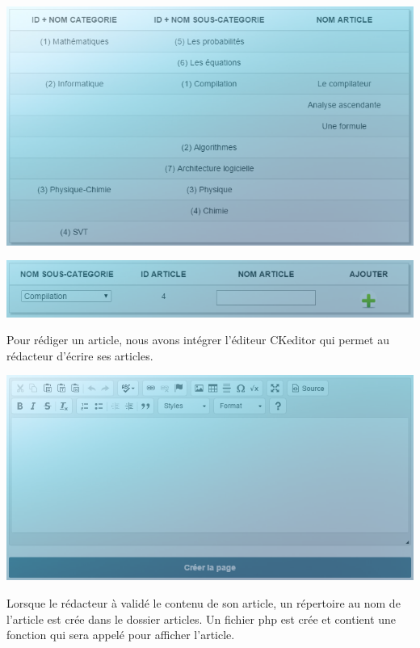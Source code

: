 \documentclass[hidelinks, 12pt,a4paper]{article}
\begin{document}
\begin{center}
\includegraphics[width=16cm]{images/ajoutart.png}\\
\end{center}

\begin{center}
\includegraphics[width=16cm]{images/ajoutart2.png}\\
\end{center}

Pour rédiger un article, nous avons intégrer l'éditeur CKeditor qui permet au rédacteur d'écrire ses articles.

\begin{center}
\includegraphics[width=16cm]{images/ajoutart3.png}\\
\end{center}

Lorsque le rédacteur à validé le contenu de son article, un répertoire au nom de l'article est crée dans le dossier articles. Un fichier php est crée et contient une fonction qui sera appelé pour afficher l'article.
\end{document}
